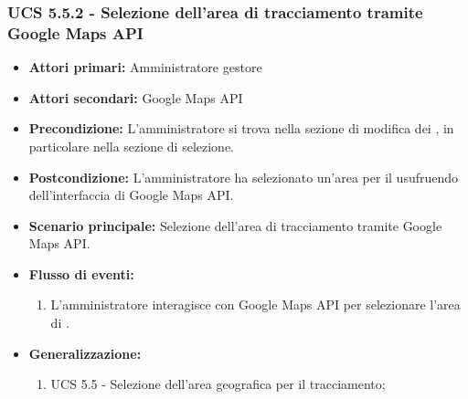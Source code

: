\subsubsection{UCS 5.5.2 - Selezione dell'area di tracciamento tramite Google Maps API}%
\begin{itemize}
\item \textbf{Attori primari:} Amministratore gestore
\item \textbf{Attori secondari:} Google Maps API
\item \textbf{Precondizione:} L'amministratore si trova nella sezione di modifica dei , in particolare nella sezione di selezione.
\item \textbf{Postcondizione:} L'amministratore ha selezionato un'area per il  usufruendo dell'interfaccia di Google Maps API.
\item \textbf{Scenario principale:} Selezione dell'area di tracciamento tramite Google Maps API.
\item \textbf{Flusso di eventi:}
\begin{enumerate}
    \item L'amministratore interagisce con Google Maps API per selezionare l'area di .
\end{enumerate}
\item \textbf{Generalizzazione:}
	\begin{enumerate}
        \item UCS 5.5 - Selezione dell'area geografica per il tracciamento;
    \end{enumerate}
\end{itemize}

